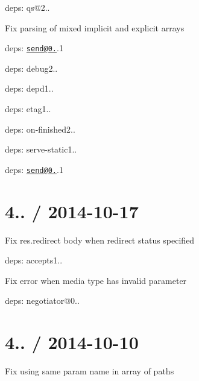{\begin{DoxyItemize}
\begin{DoxyItemize}
\end{DoxyItemize}
\item deps\+: qs@2..
\begin{DoxyItemize}
\item Fix parsing of mixed implicit and explicit arrays
\end{DoxyItemize}
\item deps\+: \href{mailto:send@0.10}{\tt send@0.}.1
\begin{DoxyItemize}
\item deps\+: debug2..
\item deps\+: depd1..
\item deps\+: etag1..
\item deps\+: on-\/finished2..
\end{DoxyItemize}
\item deps\+: serve-\/static1..
\begin{DoxyItemize}
\item deps\+: \href{mailto:send@0.10}{\tt send@0.}.1
\end{DoxyItemize}
\end{DoxyItemize}}

{\ttfamily \section*{4.. / 2014-\/10-\/17 }}

{\ttfamily }

{\ttfamily 
\begin{DoxyItemize}
\item Fix {\ttfamily res.\+redirect} body when redirect status specified
\item deps\+: accepts1..
\begin{DoxyItemize}
\item Fix error when media type has invalid parameter
\item deps\+: negotiator@0..
\end{DoxyItemize}
\end{DoxyItemize}}

{\ttfamily \section*{4.. / 2014-\/10-\/10 }}

{\ttfamily }

{\ttfamily 
\begin{DoxyItemize}
\item Fix using same param name in array of paths
\end{DoxyItemize}}

